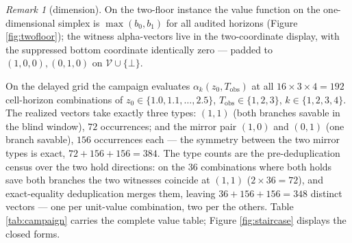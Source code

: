 \documentclass[10pt,twocolumn]{article}
\theoremstyle{plain}
\theoremstyle{definition}
\theoremstyle{remark}
\newtheorem{remark}[theorem]{Remark}
\begin{document}
\begin{remark}[dimension]\label{rem:dim}
On the two-floor instance the value function on the one-dimensional
simplex is \(\max(b_{0}, b_{1})\) for all audited horizons (Figure
\ref{fig:twofloor}); the witness alpha-vectors live in the two-coordinate
display, with the suppressed bottom coordinate identically zero --- padded
to \((1,0,0), (0,1,0)\) on \(\mathcal{V} \cup \{\bot\}\).
\end{remark}

On the delayed grid the campaign evaluates
\(\alpha_{k}(z_{0}, T_{\mathrm{obs}})\) at all
\(16 \times 3 \times 4 = 192\) cell-horizon combinations of
\(z_{0} \in \{1.0, 1.1, \dots, 2.5\}\),
\(T_{\mathrm{obs}} \in \{1, 2, 3\}\), \(k \in \{1, 2, 3, 4\}\). The
realized vectors take exactly three types: \((1, 1)\) (both branches
savable in the blind window), \(72\) occurrences; and the mirror pair
\((1, 0)\) and \((0, 1)\) (one branch savable), \(156\) occurrences each
--- the symmetry between the two mirror types is exact,
\(72 + 156 + 156 = 384\). The type counts are the pre-deduplication
census over the two hold directions: on the \(36\) combinations where
both holds save both branches the two witnesses coincide at \((1, 1)\)
(\(2 \times 36 = 72\)), and exact-equality deduplication merges them,
leaving \(36 + 156 + 156 = 348\) distinct vectors --- one per
unit-value combination, two per the others. Table \ref{tab:campaign}
carries the complete value table; Figure \ref{fig:staircase} displays
the closed forms.
\end{document}

